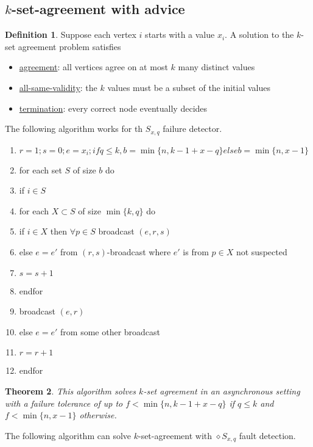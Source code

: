 \documentclass[a4paper, 12pt]{article}
\theoremstyle{plain}
\newtheorem{theorem}{Theorem}[section] %
\theoremstyle{definition}
\newtheorem{definition}[theorem]{Definition} %
\theoremstyle{lemma}
\theoremstyle{remark}
\theoremstyle{corollary}
\theoremstyle{example}
\begin{document}
	\subsection{$k$-set-agreement with advice}
	\begin{definition}
		Suppose each vertex $i$ starts with a value $x_i$. A solution to the $k$-set agreement problem satisfies
		\begin{itemize}
			\item \underline{agreement}: all vertices agree on at most $k$ many distinct values
			\item \underline{all-same-validity}: the $k$ values must be a subset of the initial values
			\item \underline{termination}: every correct node eventually decides
		\end{itemize}
	\end{definition}
	The following algorithm works for th $S_{x,q}$ failure detector.
	\begin{enumerate}
		\item $r= 1; s= 0; e=x_i; if q \leq k, b= \min\{n, k - 1 + x - q\} else b= \min\{n, x - 1\}$
		\item for each set $S$ of size $b$ do
		\item if $i \in S$
		\item for each $X\subset S$ of size $\min\{k,q\}$ do
		\item if $i \in X$ then $\forall p \in S$ broadcast $(e,r,s)$
		\item else $e=e'$ from $(r,s)$-broadcast where $e'$ is from $p \in X$ not suspected
		\item $s=s+1$
		\item endfor
		\item broadcast $(e,r)$
		\item else $e=e'$ from some other broadcast
		\item $r=r+1$
		\item endfor
	\end{enumerate}
	\begin{theorem}
		This algorithm solves $k$-set agreement in an asynchronous setting with a failure tolerance of up to $f<\min \{n,k-1+x-q\}$ if $q\leq k$ and $f<\min\{n,x-1\}$ otherwise.
	\end{theorem}
	The following algorithm can solve $k$-set-agreement with $\diamond S_{x,q}$ fault detection.
\end{document}

